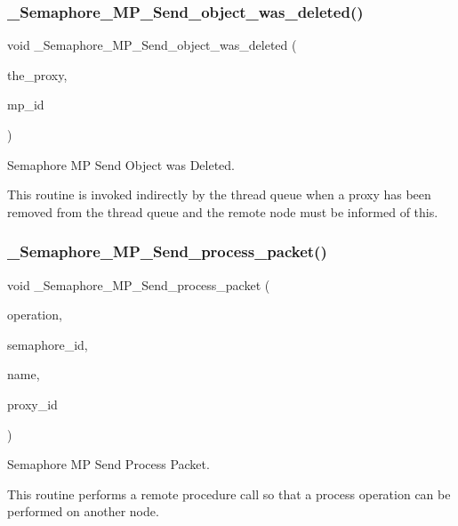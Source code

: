 \subsubsection{\texorpdfstring{\_Semaphore\_MP\_Send\_object\_was\_deleted()}{\_Semaphore\_MP\_Send\_object\_was\_deleted()}}
{\footnotesize\ttfamily void \+\_\+\+Semaphore\+\_\+\+M\+P\+\_\+\+Send\+\_\+object\+\_\+was\+\_\+deleted (\begin{DoxyParamCaption}\item[{\mbox{\hyperlink{struct__Thread__Control}{Thread\+\_\+\+Control}} $\ast$}]{the\+\_\+proxy,  }\item[{\mbox{\hyperlink{group__RTEMSScoreObject_ga5821f52a51072941bdd603e542d0863e}{Objects\+\_\+\+Id}}}]{mp\+\_\+id }\end{DoxyParamCaption})}



Semaphore MP Send Object was Deleted. 

This routine is invoked indirectly by the thread queue when a proxy has been removed from the thread queue and the remote node must be informed of this. \mbox{\label{group__ClassicSEM_gabf7ddd01f6d1775f91d196955b8c7699}} 
\subsubsection{\texorpdfstring{\_Semaphore\_MP\_Send\_process\_packet()}{\_Semaphore\_MP\_Send\_process\_packet()}}
{\footnotesize\ttfamily void \+\_\+\+Semaphore\+\_\+\+M\+P\+\_\+\+Send\+\_\+process\+\_\+packet (\begin{DoxyParamCaption}\item[{\mbox{\hyperlink{group__ClassicSEM_ga24fc0fecc46118303c1de1742a2c5adf}{Semaphore\+\_\+\+M\+P\+\_\+\+Remote\+\_\+operations}}}]{operation,  }\item[{\mbox{\hyperlink{group__RTEMSScoreObject_ga5821f52a51072941bdd603e542d0863e}{Objects\+\_\+\+Id}}}]{semaphore\+\_\+id,  }\item[{\mbox{\hyperlink{group__ClassicTasks_ga55fb63c49f68c0cbd9bee004da15b1fd}{rtems\+\_\+name}}}]{name,  }\item[{\mbox{\hyperlink{group__RTEMSScoreObject_ga5821f52a51072941bdd603e542d0863e}{Objects\+\_\+\+Id}}}]{proxy\+\_\+id }\end{DoxyParamCaption})}



Semaphore MP Send Process Packet. 

This routine performs a remote procedure call so that a process operation can be performed on another node. 